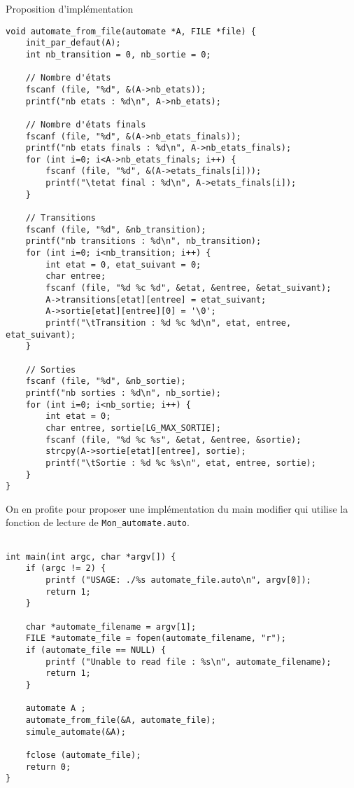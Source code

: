 \documentclass[10pt]{article}
\begin{document}
\begin{enumerate}[label=\textbf{[\alph*]}]
\newpage

\item Proposition d'implémentation
  \begin{lstlisting}
void automate_from_file(automate *A, FILE *file) {
	init_par_defaut(A);
	int nb_transition = 0, nb_sortie = 0;

	// Nombre d'états
	fscanf (file, "%d", &(A->nb_etats));
	printf("nb etats : %d\n", A->nb_etats);

	// Nombre d'états finals
	fscanf (file, "%d", &(A->nb_etats_finals));
	printf("nb etats finals : %d\n", A->nb_etats_finals);
	for (int i=0; i<A->nb_etats_finals; i++) {
		fscanf (file, "%d", &(A->etats_finals[i]));
		printf("\tetat final : %d\n", A->etats_finals[i]);
	}

	// Transitions
	fscanf (file, "%d", &nb_transition);
	printf("nb transitions : %d\n", nb_transition);
	for (int i=0; i<nb_transition; i++) {
		int etat = 0, etat_suivant = 0;
		char entree;
		fscanf (file, "%d %c %d", &etat, &entree, &etat_suivant);
		A->transitions[etat][entree] = etat_suivant;
		A->sortie[etat][entree][0] = '\0';
		printf("\tTransition : %d %c %d\n", etat, entree, etat_suivant);
	}

	// Sorties
	fscanf (file, "%d", &nb_sortie);
	printf("nb sorties : %d\n", nb_sortie);
	for (int i=0; i<nb_sortie; i++) {
		int etat = 0;
		char entree, sortie[LG_MAX_SORTIE];
		fscanf (file, "%d %c %s", &etat, &entree, &sortie);
		strcpy(A->sortie[etat][entree], sortie);
		printf("\tSortie : %d %c %s\n", etat, entree, sortie);
	}
}
  \end{lstlisting}

  On en profite pour proposer une implémentation du main modifier qui
  utilise la fonction de lecture de \texttt{Mon\_automate.auto}.

  \begin{lstlisting}

int main(int argc, char *argv[]) {
	if (argc != 2) {
		printf ("USAGE: ./%s automate_file.auto\n", argv[0]);
		return 1;
	}

	char *automate_filename = argv[1];
	FILE *automate_file = fopen(automate_filename, "r");
	if (automate_file == NULL) {
		printf ("Unable to read file : %s\n", automate_filename);
		return 1;
	}

	automate A ;
	automate_from_file(&A, automate_file);
	simule_automate(&A);

	fclose (automate_file);
	return 0;
}
  \end{lstlisting}


\end{enumerate}
\end{document}

